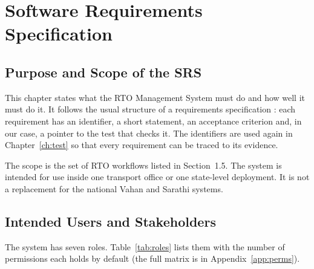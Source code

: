 \chapter{Software Requirements Specification}\label{ch:srs}

\section{Purpose and Scope of the SRS}
This chapter states what the RTO Management System must do and how well it must do it.
It follows the usual structure of a requirements specification \cite{sommerville2015}:
each requirement has an identifier, a short statement, an acceptance criterion and, in
our case, a pointer to the test that checks it. The identifiers are used again in
Chapter~\ref{ch:test} so that every requirement can be traced to its evidence.

The scope is the set of RTO workflows listed in Section~1.5. The system is intended for
use inside one transport office or one state-level deployment. It is not a replacement
for the national Vahan and Sarathi systems.

\section{Intended Users and Stakeholders}
The system has seven roles. Table~\ref{tab:roles} lists them with the number of
permissions each holds by default (the full matrix is in Appendix~\ref{app:perms}).

